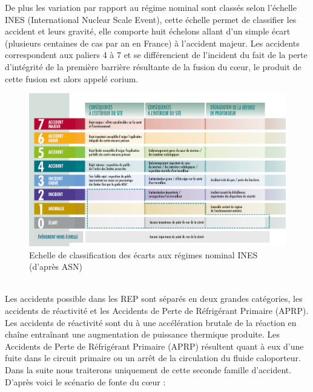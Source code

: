 \documentclass[a4paper,11pt]{report}    %
\begin{document}
De plus les variation par rapport au régime nominal sont classés selon l'échelle INES (International Nuclear Scale Event), cette échelle permet de classifier les accident et leurs gravité, elle comporte huit échelons allant d'un simple écart (plusieurs centaines de cas par an en France) à l'accident majeur. Les accidents correspondent aux paliers 4 à 7 et se différencient de l'incident du fait de la perte d'intégrité de la première barrière résultante de la fusion du c\oe ur, le produit de cette fusion est alors appelé corium.
\begin{figure}[h!]
	\centering
	\includegraphics[width=0.7\linewidth]{figure/echelle-ines-article}
	\caption[Echelle de classification des écarts aux régimes nominal INES]{Echelle de classification des écarts aux régimes nominal INES (d'après ASN)}
	\label{fig:echelle-ines-article}
\end{figure}\\
Les accidents possible dans les REP sont séparés en deux grandes catégories, les accidents de réactivité et les Accidents de Perte de Réfrigérant Primaire (APRP). Les accidents de réactivité sont du à une accélération brutale de la réaction en chaîne entraînant une augmentation de puissance thermique produite. Les Accidents de Perte de Réfrigérant Primaire (APRP) résultent quant à eux d'une fuite dans le circuit primaire ou un arrêt de la circulation du fluide caloporteur. Dans la suite nous traiterons uniquement de cette seconde famille d'accident.
D'après \cite{kolev_multiphase_2015} voici le scénario de fonte du c\oe ur :
\end{document}

